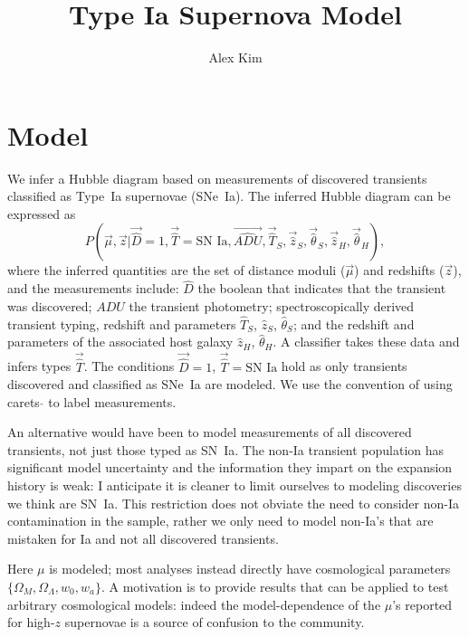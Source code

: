 \documentclass[preprint]{aastex}
\begin{document}
\title{Type Ia Supernova Model}
\author{Alex Kim}

\section{Model}
We infer a Hubble diagram based on measurements of discovered transients
classified as Type~Ia supernovae (SNe~Ia).  The inferred Hubble diagram can be
expressed as
\begin{equation}
P(\vec{\mu},\vec{z} |  \vec{\hat{D}}=1, \vec{\hat{T}}=\text{SN~Ia}, \vec{\hat{ADU}}, \vec{\hat{T}}_S,\vec{\hat{z}}_S,
\vec{\hat{\theta}}_S,\vec{\hat{z}}_H,\vec{\hat{\theta}}_H),
\label{hd:eqn}
\end{equation}
where the inferred quantities are the set of distance moduli ($\vec{\mu}$)
and redshifts ($\vec{z}$), and 
the measurements include: $\hat{D}$ the boolean that indicates that
the transient was discovered; $\hat{ADU}$ the transient photometry;
spectroscopically derived transient
typing, redshift and parameters $\hat{T}_S$, $\hat{z}_S$, $\hat{\theta}_S$;
and the redshift and parameters of the associated host galaxy $\hat{z}_{H}$, $\hat{\theta}_H$.
A classifier takes these data and infers types $\vec{\hat{T}}$.
The conditions $\vec{\hat{D}}=1$, $\vec{\hat{T}}=\text{SN~Ia}$ hold as only transients
discovered and classified as SNe~Ia are modeled.  We use the convention of using carets $\hat{}$
to  label measurements.

An alternative would have been to
model measurements of all discovered transients, not just those typed as SN~Ia. 
The non-Ia transient population has significant model uncertainty and the information they impart on the expansion history is weak:  I anticipate it is cleaner to limit ourselves to
modeling discoveries we think are SN~Ia. This restriction does not obviate the need
to consider non-Ia contamination in the sample, rather
we only need to model non-Ia's
that are mistaken for Ia and not all discovered transients. 

Here $\mu$ is modeled; most analyses instead
directly have cosmological parameters $\{\Omega_M, \Omega_\Lambda, w_0, w_a\}$.
A motivation is to provide results that can be applied to test arbitrary cosmological models:
indeed the model-dependence of the $\mu$'s reported for high-$z$ supernovae 
\citep[e.g.][]{2012ApJ...746...85S} is a source of confusion to the community.
\end{document}
